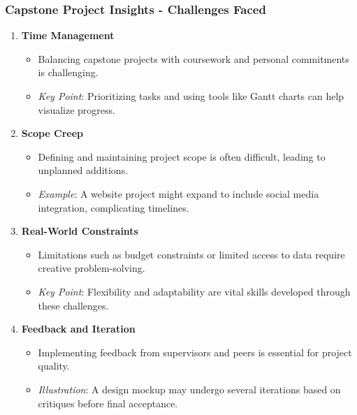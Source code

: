 \documentclass{beamer}
\begin{document}
\begin{frame}[fragile]
    \frametitle{Capstone Project Insights - Challenges Faced}
    \begin{enumerate}
        \item \textbf{Time Management}
            \begin{itemize}
                \item Balancing capstone projects with coursework and personal commitments is challenging.
                \item \textit{Key Point}: Prioritizing tasks and using tools like Gantt charts can help visualize progress.
            \end{itemize}
        
        \item \textbf{Scope Creep}
            \begin{itemize}
                \item Defining and maintaining project scope is often difficult, leading to unplanned additions.
                \item \textit{Example}: A website project might expand to include social media integration, complicating timelines.
            \end{itemize}

        \item \textbf{Real-World Constraints}
            \begin{itemize}
                \item Limitations such as budget constraints or limited access to data require creative problem-solving.
                \item \textit{Key Point}: Flexibility and adaptability are vital skills developed through these challenges.
            \end{itemize}

        \item \textbf{Feedback and Iteration}
            \begin{itemize}
                \item Implementing feedback from supervisors and peers is essential for project quality.
                \item \textit{Illustration}: A design mockup may undergo several iterations based on critiques before final acceptance.
            \end{itemize}
    \end{enumerate}
\end{frame}
\end{document}
